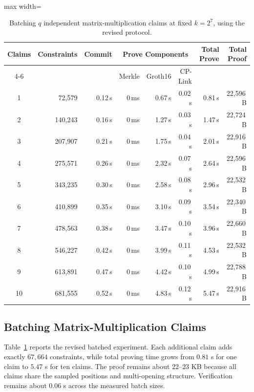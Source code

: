 \begin{table}[!t]
\centering
\scriptsize
\setlength{\tabcolsep}{3pt}
\begin{adjustbox}{max width=\textwidth}
\begin{tabular}{c r r rrr r r}
\toprule
\textbf{Claims} & \textbf{Constraints} & \textbf{Commit}
& \multicolumn{3}{c}{\textbf{Prove Components}}
& \textbf{Total Prove} & \textbf{Total Proof} \\
\cmidrule(lr){4-6}
& & & Merkle & Groth16 & CP-Link & & \\
\midrule
1  & 72{,}579  & 0.12\,s & 0\,ms & 0.67\,s & 0.02\,s & 0.81\,s & 22{,}596\,B \\
2  & 140{,}243 & 0.16\,s & 0\,ms & 1.27\,s & 0.03\,s & 1.47\,s & 22{,}724\,B \\
3  & 207{,}907 & 0.21\,s & 0\,ms & 1.75\,s & 0.04\,s & 2.01\,s & 22{,}916\,B \\
4  & 275{,}571 & 0.26\,s & 0\,ms & 2.32\,s & 0.07\,s & 2.64\,s & 22{,}596\,B \\
5  & 343{,}235 & 0.30\,s & 0\,ms & 2.58\,s & 0.08\,s & 2.96\,s & 22{,}532\,B \\
6  & 410{,}899 & 0.35\,s & 0\,ms & 3.10\,s & 0.09\,s & 3.54\,s & 22{,}340\,B \\
7  & 478{,}563 & 0.38\,s & 0\,ms & 3.47\,s & 0.10\,s & 3.96\,s & 22{,}660\,B \\
8  & 546{,}227 & 0.42\,s & 0\,ms & 3.99\,s & 0.11\,s & 4.53\,s & 22{,}532\,B \\
9  & 613{,}891 & 0.47\,s & 0\,ms & 4.42\,s & 0.10\,s & 4.99\,s & 22{,}788\,B \\
10 & 681{,}555 & 0.52\,s & 0\,ms & 4.83\,s & 0.12\,s & 5.47\,s & 22{,}916\,B \\
\bottomrule
\end{tabular}
\end{adjustbox}
\vspace{4pt}
\caption{Batching \(q\) independent matrix-multiplication claims at fixed
\(k=2^7\), using the revised protocol.}
\label{tab:lamp-batch}
\end{table}

\subsection{Batching Matrix-Multiplication Claims}
Table~\ref{tab:lamp-batch} reports the revised batched experiment.  Each
additional claim adds exactly \(67{,}664\) constraints, while total proving
time grows from \(0.81\) s for one claim to \(5.47\) s for ten claims.  The
proof remains about \(22\)--\(23\) KB because all claims share the sampled
positions and multi-opening structure.  Verification remains about \(0.06\) s
across the measured batch sizes.

